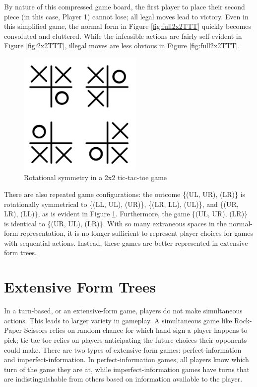 By nature of this compressed game board, the first player to place their second piece (in this case, Player 1) cannot lose; all legal moves lead to victory. Even in this simplified game, the normal form in Figure \ref{fig:full2x2TTT} quickly becomes convoluted and cluttered. While the infeasible actions are fairly self-evident in Figure \ref{fig:2x2TTT}, illegal moves are less obvious in Figure \ref{fig:full2x2TTT}.
\begin{figure}[H]
  \centering
  \includegraphics[width=6cm]{figures/TTTRotation.png}
  \caption{Rotational symmetry in a 2x2 tic-tac-toe game}
  \label{fig:2x2TTTRotation}
\end{figure}
There are also repeated game configurations: the outcome \{(UL, UR), (LR)\} is rotationally symmetrical to \{(LL, UL), (UR)\}, \{(LR, LL), (UL)\}, and \{(UR, LR), (LL)\}, as is evident in Figure \ref{fig:2x2TTTRotation}. Furthermore, the game \{(UL, UR), (LR)\} is identical to \{(UR, UL), (LR)\}. With so many extraneous spaces in the normal-form representation, it is no longer sufficient to represent player choices for games with sequential actions. Instead, these games are better represented in extensive-form trees.\\

\section{Extensive Form Trees}
In a turn-based, or an extensive-form game, players do not make simultaneous actions. This leads to larger variety in gameplay. A simultaneous game like Rock-Paper-Scissors relies on random chance for which hand sign a player happens to pick; tic-tac-toe relies on players anticipating the future choices their opponents could make. There are two types of extensive-form games: perfect-information and imperfect-information. In perfect-information games, all players know which turn of the game they are at, while imperfect-information games have turns that are indistinguishable from others based on information available to the player.\\

